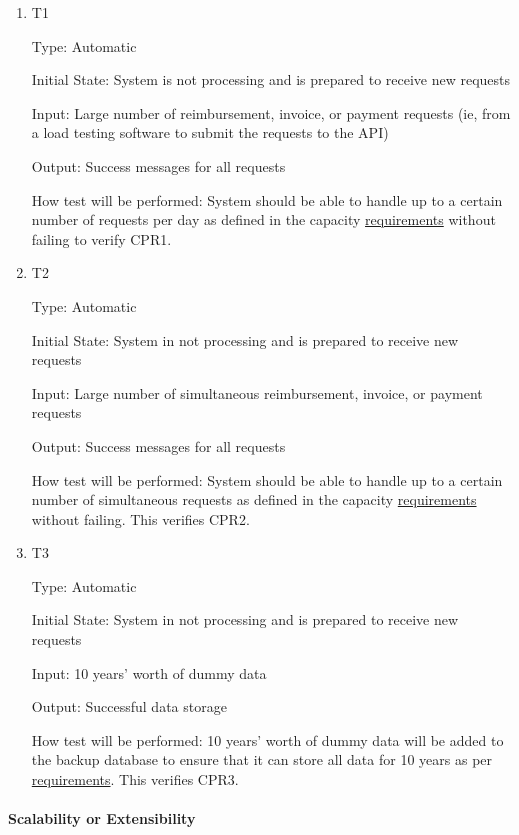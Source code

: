 \documentclass[12pt, titlepage]{article}
\begin{document}
\begin{enumerate}
\item{T1\\}
\hypertarget{NFR12.5-TC1}{}

Type: Automatic

Initial State: System is not processing and is prepared to receive new requests

Input: Large number of reimbursement, invoice, or payment requests (ie, from a load testing software to submit the requests to the API)

Output: Success messages for all requests

How test will be performed: System should be able to handle up to a certain number of requests per day as defined in the capacity \hyperlink{checklist-nfr12}{requirements} without failing to verify CPR1.

\item{T2\\}
\hypertarget{NFR12.5-TC2}{}

Type: Automatic

Initial State: System in not processing and is prepared to receive new requests

Input: Large number of simultaneous reimbursement, invoice, or payment requests

Output: Success messages for all requests

How test will be performed: System should be able to handle up to a certain number of simultaneous requests as defined in the capacity \hyperlink{checklist-nfr12}{requirements} without failing. This verifies CPR2.

\item{T3\\}
\hypertarget{NFR12.5-TC3}{}

Type: Automatic

Initial State: System in not processing and is prepared to receive new requests

Input: 10 years’ worth of dummy data

Output: Successful data storage

How test will be performed: 10 years’ worth of dummy data will be added to the backup database to ensure that it can store all data for 10 years as per \hyperlink{checklist-nfr12}{requirements}. This verifies CPR3.

\end{enumerate}

\paragraph{Scalability or Extensibility}
\end{document}

